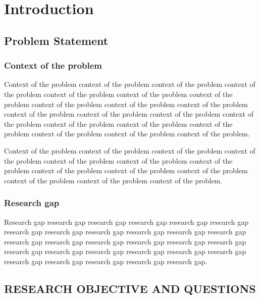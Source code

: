
\chapter{Introduction}

\section{Problem Statement}

\nocite{Shannon:A_Mathematical_Theory_of_Communications}

\subsection{Context of the problem}

Context of the problem context of the problem context of the problem
context of the problem context of the problem context of the problem
context of the problem context of the problem context of the problem
context of the problem context of the problem context of the problem
context of the problem context of the problem context of the problem
context of the problem context of the problem context of the problem
context of the problem context of the problem.

Context of the problem context of the problem context of the problem
context of the problem context of the problem context of the problem
context of the problem context of the problem context of the problem
context of the problem context of the problem context of the problem
context of the problem.

\subsection{Research gap}

Research gap research gap research gap research gap research gap
research gap research gap research gap research gap research gap
research gap research gap research gap research gap research gap
research gap research gap research gap research gap research gap
research gap research gap research gap research gap research gap
research gap research gap research gap research gap.

\section{RESEARCH OBJECTIVE AND QUESTIONS}

